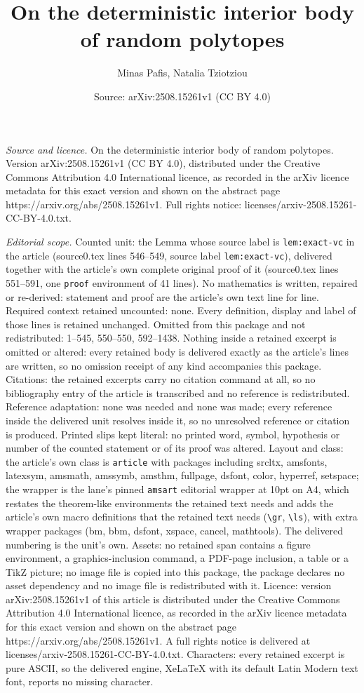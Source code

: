 \documentclass[10pt,a4paper]{amsart}
\title[On the deterministic interior body of random polytopes]{On the deterministic interior body of random polytopes}
\author{Minas Pafis, Natalia Tziotziou}
\date{Source: arXiv:2508.15261v1 (CC BY 4.0)}
\begin{document}
\maketitle

\noindent\emph{Source and licence.} On the deterministic interior body of random polytopes. Version arXiv:2508.15261v1 (CC BY 4.0), distributed under the Creative Commons Attribution 4.0 International licence, as recorded in the arXiv licence metadata for this exact version and shown on the abstract page https://arxiv.org/abs/2508.15261v1. Full rights notice: licenses/arxiv-2508.15261-CC-BY-4.0.txt.\par\smallskip

\noindent\textit{Editorial scope.} Counted unit: the Lemma whose source label is \texttt{lem:exact-vc} in the article (source0.tex lines 546--549, source label \texttt{lem:exact-vc}), delivered together with the article's own complete original proof of it (source0.tex lines 551--591, one \texttt{proof} environment of 41 lines). No mathematics is written, repaired or re-derived: statement and proof are the article's own text line for line. Required context retained uncounted: none. Every definition, display and label of those lines is retained unchanged. Omitted from this package and not redistributed: 1--545, 550--550, 592--1438. Nothing inside a retained excerpt is omitted or altered: every retained body is delivered exactly as the article's lines are written, so no omission receipt of any kind accompanies this package. Citations: the retained excerpts carry no citation command at all, so no bibliography entry of the article is transcribed and no reference is redistributed. Reference adaptation: none was needed and none was made; every reference inside the delivered unit resolves inside it, so no unresolved reference or citation is produced. Printed slips kept literal: no printed word, symbol, hypothesis or number of the counted statement or of its proof was altered. Layout and class: the article's own class is \texttt{article} with packages including srcltx, amsfonts, latexsym, amsmath, amssymb, amsthm, fullpage, dsfont, color, hyperref, setspace; the wrapper is the lane's pinned \texttt{amsart} editorial wrapper at 10pt on A4, which restates the theorem-like environments the retained text needs and adds the article's own macro definitions that the retained text needs (\texttt{\textbackslash gr}, \texttt{\textbackslash ls}), with extra wrapper packages (bm, bbm, dsfont, xspace, cancel, mathtools). The delivered numbering is the unit's own. Assets: no retained span contains a figure environment, a graphics-inclusion command, a PDF-page inclusion, a table or a TikZ picture; no image file is copied into this package, the package declares no asset dependency and no image file is redistributed with it. Licence: version arXiv:2508.15261v1 of this article is distributed under the Creative Commons Attribution 4.0 International licence, as recorded in the arXiv licence metadata for this exact version and shown on the abstract page https://arxiv.org/abs/2508.15261v1. A full rights notice is delivered at licenses/arxiv-2508.15261-CC-BY-4.0.txt. Characters: every retained excerpt is pure ASCII, so the delivered engine, XeLaTeX with its default Latin Modern text font, reports no missing character.
\end{document}
